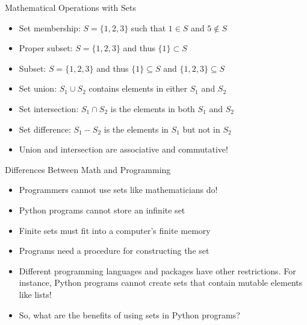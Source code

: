 \documentclass[14pt,aspectratio=169]{beamer}
\begin{document}
%
\begin{frame}{Mathematical Operations with Sets}
  \begin{itemize}
    \item Set membership: $S = \{1, 2, 3\}$ such that $1 \in S$ and $5 \notin S$
      \vspace*{-.15in}
    \item Proper subset: $S = \{1, 2, 3\}$ and thus $\{1\} \subset S$
      \vspace*{-.15in}
    \item Subset: $S = \{1, 2, 3\}$ and thus $\{1\} \subseteq S$ and $\{1, 2, 3\} \subseteq S$
      \vspace*{-.15in}
    \item Set union: $S_1 \cup S_2$ contains elements in either $S_1$ and $S_2$
      \vspace*{-.15in}
    \item Set intersection: $S_1 \cap S_2$ is the elements in both $S_1$ and $S_2$
      \vspace*{-.15in}
    \item Set difference: $S_1 - S_2$ is the elements in $S_1$ but not in $S_2$
      \vspace*{-.15in}
    \item Union and intersection are associative and commutative!
  \end{itemize}
\end{frame}

%
\begin{frame}{Differences Between Math and Programming}
  \begin{itemize}
    \item Programmers cannot use sets like mathematicians do!
      \vspace*{-.15in}
    \item Python programs cannot store an infinite set
      \vspace*{-.15in}
    \item Finite sets must fit into a computer's finite memory
      \vspace*{-.15in}
    \item Programs need a procedure for constructing the set
      \vspace*{-.15in}
    \item Different programming languages and packages have other restrictions.
      For instance, Python programs cannot create sets that contain mutable
      elements like lists!
      \vspace*{-.15in}
    \item So, what are the benefits of using sets in Python programs?
  \end{itemize}
\end{frame}
\end{document}
